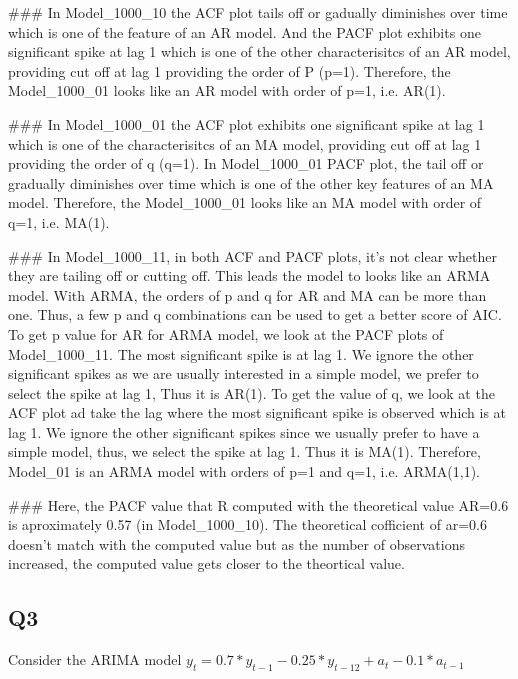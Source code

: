 \documentclass[
]{article}
\begin{document}
\begin{enumerate}[label=(\alph*)]
### In Model_1000_10 the ACF plot tails off or gadually diminishes over time which is one of the feature of an AR model. And the PACF plot exhibits one significant spike at lag 1 which is one of the other characterisitcs of an AR model, providing cut off at lag 1 providing the order of P (p=1). Therefore, the Model_1000_01 looks like an AR model with order of p=1, i.e. AR(1). 

### In Model_1000_01 the ACF plot exhibits one significant spike at lag 1 which is one of the characterisitcs of an MA model, providing cut off at lag 1 providing the order of q (q=1). In Model_1000_01 PACF plot, the tail off or gradually diminishes over time which is one of the other key features of an MA model. Therefore, the Model_1000_01 looks like an MA model with order of q=1, i.e. MA(1).                

### In Model_1000_11, in both ACF and PACF plots, it’s not clear whether they are tailing off or cutting off. This leads the model to looks like an ARMA model. With ARMA, the orders of p and q for AR and MA can be more than one. Thus, a few p and q combinations can be used to get a better score of AIC. To get p value for AR for ARMA model, we look at the PACF plots of Model_1000_11. The most significant spike is at lag 1. We ignore the other significant spikes as we are usually interested in a simple model, we prefer to select the spike at lag 1, Thus it is AR(1). To get the value of q, we look at the ACF plot ad take the lag where the most significant spike is observed which is at lag 1. We ignore the other significant spikes since we usually prefer to have a simple model, thus, we select the spike at lag 1. Thus it is MA(1). Therefore, Model_01 is an ARMA model with orders of p=1 and q=1, i.e. ARMA(1,1).

### Here, the PACF value that R computed with the theoretical value AR=0.6 is aproximately 0.57 (in Model_1000_10). The theoretical cofficient of ar=0.6 doesn't match with the computed value but as the number of observations increased, the computed value gets closer to the theortical value. 

\end{enumerate}

\hypertarget{q3}{%
\subsection{Q3}\label{q3}}

Consider the ARIMA model
\(y_t=0.7*y_{t-1}-0.25*y_{t-12}+a_t-0.1*a_{t-1}\)
\end{document}
